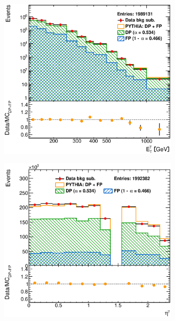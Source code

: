 \documentclass[12pt, twoside]{article}
\numberwithin{equation}{section}
\numberwithin{figure}{section}
\newenvironment{changemargin}[2]{%
\begin{list}{}{%
\setlength{\topsep}{0pt}%
\setlength{\leftmargin}{#1}%
\setlength{\rightmargin}{#2}%
\setlength{\listparindent}{\parindent}%
\setlength{\itemindent}{\parindent}%
\setlength{\parsep}{\parskip}%
}%
\item[]}{\end{list}}
\begin{document}
\begin{figure}[H]
    \centering
    \checkoddpage
    \ifoddpage
        \begin{changemargin}{-1.0cm}{-0.75cm}
    \else
        \begin{changemargin}{-0.75cm}{-1.0cm}
    \fi
        \begin{subfigure}[b]{0.37\textwidth}
            \includegraphics[width=\textwidth]{./images/BackgroundSubtractedPythiaOptimised/OPT_SIG_EVENTS-101.eps}
            \subcaption{}
            \label{fig:BSEtPhotonPYTHIA_Optimised}
        \end{subfigure}
        \begin{subfigure}[b]{0.37\textwidth}
            \includegraphics[width=\textwidth]{./images/BackgroundSubtractedPythiaOptimised/OPT_SIG_EVENTS-102.eps}

\end{subfigure}
\end{changemargin}
\end{changemargin}
\end{figure}
\end{document}
